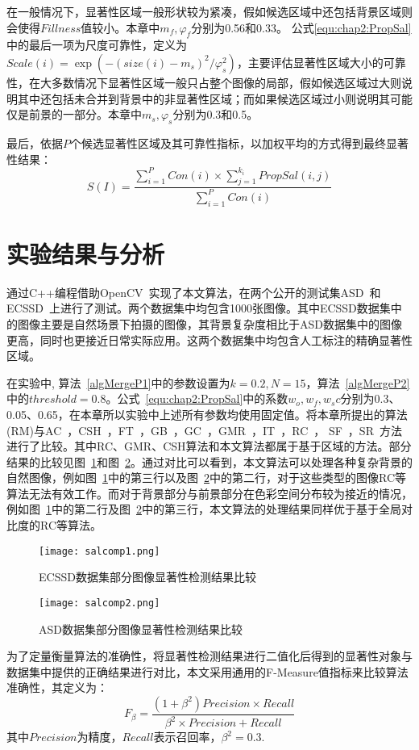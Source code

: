 在一般情况下，显著性区域一般形状较为紧凑，假如候选区域中还包括背景区域则会使得$Fillness$值较小。本章中$m_f,φ_f$分别为0.56和0.33。 公式\ref{equ:chap2:PropSal}中的最后一项为尺度可靠性，定义为$Scale(i)= \exp(-(size(i)- m_s)^2/\varphi_s^2)$，主要评估显著性区域大小的可靠性，在大多数情况下显著性区域一般只占整个图像的局部，假如候选区域过大则说明其中还包括未合并到背景中的非显著性区域；而如果候选区域过小则说明其可能仅是前景的一部分。本章中$m_s,φ_s$分别为0.3和0.5。\par

最后，依据$P$个候选显著性区域及其可靠性指标，以加权平均的方式得到最终显著性结果：
$$ S(I) = \frac{\sum_{i=1}^{P}Con(i) \times \sum_{j=1}^{k_i}PropSal(i,j)}{\sum_{i=1}^{P}Con(i)}$$


\section{实验结果与分析}
\label{sec:results}
通过C++编程借助OpenCV~\cite{opencv_library}实现了本文算法，在两个公开的测试集ASD~\cite{Achanta08}和ECSSD~\cite{ECSSD}上进行了测试。两个数据集中均包含1000张图像。其中ECSSD数据集中的图像主要是自然场景下拍摄的图像，其背景复杂度相比于ASD数据集中的图像更高，同时也更接近日常实际应用。这两个数据集中均包含人工标注的精确显著性区域。\par
在实验中, 算法~\ref{algMergeP1}中的参数设置为$k=0.2,N=15$，算法~\ref{algMergeP2}中的$threshold=0.8$。公式~\ref{equ:chap2:PropSal}中的系数$w_o,w_f,w_sc$分别为0.3、0.05、0.65，在本章所以实验中上述所有参数均使用固定值。将本章所提出的算法 (RM)与AC~\cite{Achanta08}，CSH~\cite{Yan2014Hierarchical}，FT~\cite{saliencyFilter}，GB~\cite{Harel07graph-basedvisual}，GC~\cite{GC}，GMR~\cite{GMR}，IT~\cite{itti}，RC~\cite{ChengPAMI}， SF~\cite{saliencyFilter}，SR~\cite{SR}方法进行了比较。其中RC、GMR、CSH算法和本文算法都属于基于区域的方法。部分结果的比较见图~\ref{fig:chap2:comp1}和图~\ref{fig:chap2:comp2}。通过对比可以看到，本文算法可以处理各种复杂背景的自然图像，例如图~\ref{fig:chap2:comp1}中的第三行以及图~\ref{fig:chap2:comp2}中的第二行，对于这些类型的图像RC等算法无法有效工作。而对于背景部分与前景部分在色彩空间分布较为接近的情况，例如图~\ref{fig:chap2:comp1}中的第二行及图~\ref{fig:chap2:comp2}中的第三行，本文算法的处理结果同样优于基于全局对比度的RC等算法。\par
\begin{figure}[h]
  \centering%
      {\texttt{[image: salcomp1.png]}}

  \caption{ECSSD数据集部分图像显著性检测结果比较}
  \label{fig:chap2:comp1}
\end{figure}
\begin{figure}[h]
  \centering%
      {\texttt{[image: salcomp2.png]}}

  \caption{ASD数据集部分图像显著性检测结果比较}
  \label{fig:chap2:comp2}
\end{figure}
为了定量衡量算法的准确性，将显著性检测结果进行二值化后得到的显著性对象与数据集中提供的正确结果进行对比，本文采用通用的F-Measure值指标来比较算法准确性，其定义为：
$$F_{\beta} = \frac{(1+\beta^2)Precision \times Recall}{\beta^2 \times Precision + Recall}$$
其中$Precision$为精度，$Recall$表示召回率，$\beta^2=0.3$. \par

